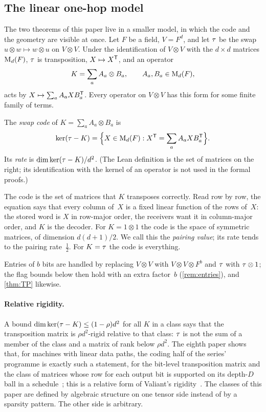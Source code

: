 \subsection{The linear one-hop model}\label{sec:onehop}

The two theorems of this paper live in a smaller model, in which the code and the geometry are visible at once. Let $F$
be a field, $V=F^d$, and let $\tau$ be the swap $u\otimes w\mapsto w\otimes u$ on $V\otimes V$. Under the identification
of $V\otimes V$ with the $d\times d$ matrices $\mathrm{M}_d(F)$, $\tau$ is transposition, $X\mapsto X^{\mathsf{T}}$, and an operator
\[
  K=\sum_{a}A_a\otimes B_a,\qquad A_a,B_a\in\mathrm{M}_d(F),
\]
acts by $X\mapsto\sum_aA_aXB_a^{\mathsf{T}}$. Every operator on $V\otimes V$ has this form for some finite family of terms.

\begin{definition}\label{def:swapcode}
The \emph{swap code} of $K=\sum_aA_a\otimes B_a$ is
\[
  \ker(\tau-K)=\Bigl\{X\in\mathrm{M}_d(F): X^{\mathsf{T}}=\sum_aA_aXB_a^{\mathsf{T}}\Bigr\}.
\]
Its \emph{rate} is $\dim\ker(\tau-K)/d^2$. (The Lean definition is the set of matrices on the right; its identification
with the kernel of an operator is not used in the formal proofs.)
\end{definition}

The code is the set of matrices that $K$ transposes correctly. Read row by row, the equation says that every column
of~$X$ is a fixed linear function of the rows of~$X$: the stored word is $X$ in row-major order, the receivers want it in
column-major order, and $K$ is the decoder. For $K=1\otimes1$ the code is the space of symmetric matrices, of dimension
$d(d+1)/2$. We call this the \emph{pairing value}; its rate tends to the pairing rate~$\tfrac12$. For $K=\tau$ the code
is everything.

Entries of $b$ bits are handled by replacing $V\otimes V$ with $V\otimes V\otimes F^b$ and $\tau$ with $\tau\otimes1$; the
flag bounds below then hold with an extra factor~$b$ (\cref{rem:entries}), and \cref{thm:TP} likewise.

\paragraph{Relative rigidity.} A bound $\dim\ker(\tau-K)\le(1-\rho)d^2$ for all $K$ in a class says that the transposition
matrix is $\rho d^2$-rigid relative to that class: $\tau$ is not the sum of a member of the class and a matrix of rank
below $\rho d^2$. The eighth paper shows that, for machines with linear data paths, the coding half of the series'
programme is exactly such a statement, for the bit-level transposition matrix and the class of matrices whose row
for each output bit is supported on its depth-$D$ ball in a
schedule~\cite[Theorem~7.5 and Problem~10.6]{EighthPaper2026}; this is a relative form of Valiant's
rigidity~\cite{Valiant1977}. The classes of this paper are defined by algebraic structure on one tensor side instead of
by a sparsity pattern. The other side is arbitrary.
